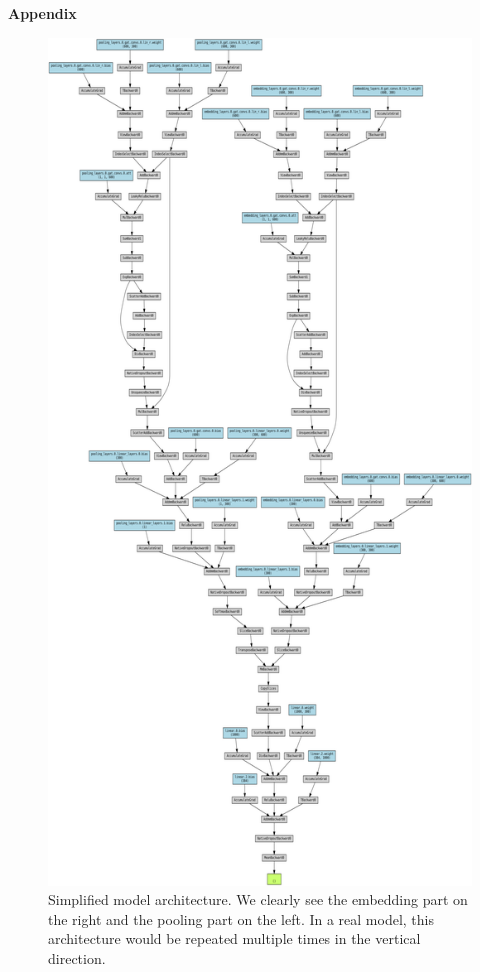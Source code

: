 \documentclass[switch, 11pt]{article}
\begin{document}
\begin{multicols}{2}
    \newpage
    

\end{multicols}

\newpage
\appendix

\vspace{5mm}
\begin{center}
    {\Large \bfseries Appendix} \\
\end{center}
\begin{figure}[H]
    \centering
    \includegraphics[width=0.85\columnwidth]{figures/architecture.png}
    \caption{Simplified model architecture. We clearly see the embedding part on the right and the pooling part on the left. In a real model, this architecture would be repeated multiple times in the vertical direction.}
    \label{fig:architecture}
\end{figure}
\end{document}
